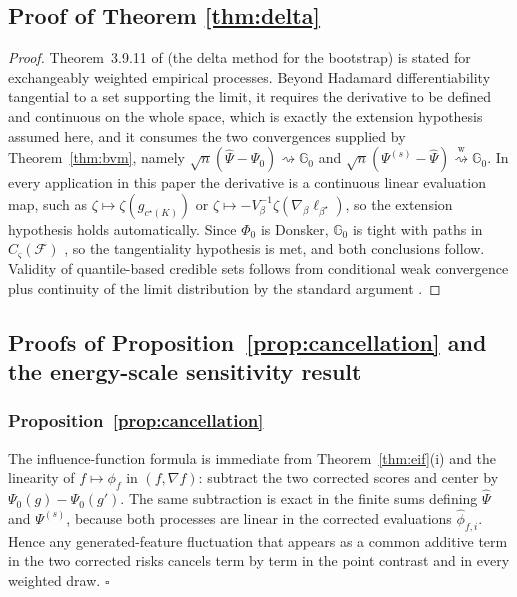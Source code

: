 \documentclass[11pt]{article}
\newcommand{\G}{\mathbb G}
\newcommand{\dto}{\rightsquigarrow}
\newcommand{\dtow}{\overset{\mathrm w}{\rightsquigarrow}}
\newcommand{\calF}{\mathcal F}
\newcommand{\hPsi}{\widehat\Psi}
\newcommand{\hphi}{\widehat\phi}
\begin{document}
\subsection{Proof of Theorem \ref{thm:delta}}\label{sec:proof:thm:delta}
\begin{proof}
Theorem~3.9.11 of \cite{vdvwellner1996} (the delta method for the bootstrap) is stated for exchangeably weighted empirical processes. Beyond Hadamard differentiability tangential to a set supporting the limit, it requires the derivative to be defined and continuous on the whole space, which is exactly the extension hypothesis assumed here, and it consumes the two convergences supplied by Theorem~\ref{thm:bvm}, namely $\sqrt n(\hPsi-\Psi_0)\dto\G_0$ and $\sqrt n(\Psi^{(s)}-\hPsi)\dtow\G_0$. In every application in this paper the derivative is a continuous linear evaluation map, such as $\zeta\mapsto\zeta(g_{c^\star(K)})$ or $\zeta\mapsto-V_\beta^{-1}\zeta(\nabla_\beta\ell_{\beta^\star})$, so the extension hypothesis holds automatically. Since $\Phi_0$ is Donsker, $\G_0$ is tight with paths in $C_\varsigma(\calF)$ \citep[Section~1.5]{vdvwellner1996}, so the tangentiality hypothesis is met, and both conclusions follow. Validity of quantile-based credible sets follows from conditional weak convergence plus continuity of the limit distribution by the standard argument \citep[Lemma~23.3]{vandervaart1998}.
\end{proof}

\subsection{Proofs of Proposition~\ref{prop:cancellation} and the energy-scale sensitivity result}\label{app:props}

\subsubsection{Proposition~\ref{prop:cancellation}}
The influence-function formula is immediate from Theorem~\ref{thm:eif}\textup{(i)} and the linearity of $f\mapsto\phi_f$ in $(f,\nabla f)$: subtract the two corrected scores and center by $\Psi_0(g)-\Psi_0(g')$.  The same subtraction is exact in the finite sums defining $\hPsi$ and $\Psi^{(s)}$, because both processes are linear in the corrected evaluations $\hphi_{f,i}$.  Hence any generated-feature fluctuation that appears as a common additive term in the two corrected risks cancels term by term in the point contrast and in every weighted draw. \hfill$\square$
\end{document}
